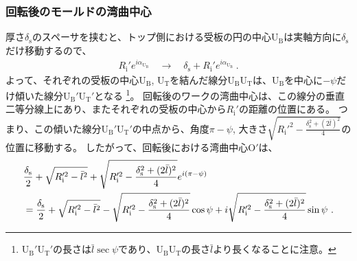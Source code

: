 \subsubsection{回転後のモールドの湾曲中心}
厚さ$\delta_\mathrm s$のスペーサを挟むと、トップ側における受板の円の中心U$_\mathrm B$は実軸方向に$\delta_\mathrm s$だけ移動するので、
\begin{align*}
  R_\mathrm i'e^{i\alpha_{\mathrm U_\mathrm B}}
  \quad\longrightarrow\quad
  \delta_\mathrm s+R_\mathrm i'e^{i\alpha_{\mathrm U_\mathrm B}}\ .
\end{align*}
よって、それぞれの受板の中心U$_\mathrm B$, U$_\mathrm T$を結んだ線分U$_\mathrm B$U$_\mathrm T$は、U$_\mathrm B$を中心に$-\psi$だけ傾いた線分U$_\mathrm B'$U$_\mathrm T'$となる
\footnote{%
U$_\mathrm B'$U$_\mathrm T'$の長さは$\bar l\sec\psi$であり、U$_\mathrm B$U$_\mathrm T$の長さ$\bar l$より長くなることに注意。}。
回転後のワークの湾曲中心は、この線分の垂直二等分線上にあり、またそれぞれの受板の中心から$R_\mathrm i'$の距離の位置にある。
つまり、この傾いた線分U$_\mathrm B'$U$_\mathrm T'$の中点から、角度$\pi-\psi$, 大きさ$\sqrt{R_\mathrm i'^2-\frac{\delta_\mathrm s^2+(2\bar l)^2}4}$の位置に移動する。
したがって、回転後における湾曲中心O$'$は、
\begin{align}
  \notag
  & \frac{\delta_\mathrm s}2+\sqrt{R_\mathrm i'^2-\bar l^2}
    +\sqrt{R_\mathrm i'^2-\frac{\delta_\mathrm s^2+(2\bar l)^2}4}e^{i(\pi-\psi)}\\
  & = \frac{\delta_\mathrm s}2+\sqrt{R_\mathrm i'^2-\bar l^2}-\sqrt{R_\mathrm i'^2-\frac{\delta_\mathrm s^2+(2\bar l)^2}4}\cos\psi
      +i\sqrt{R_\mathrm i'^2-\frac{\delta_\mathrm s^2+(2\bar l)^2}4}\sin\psi\ .
    \label{eq:afterOrgin}
\end{align}

\clearpage
